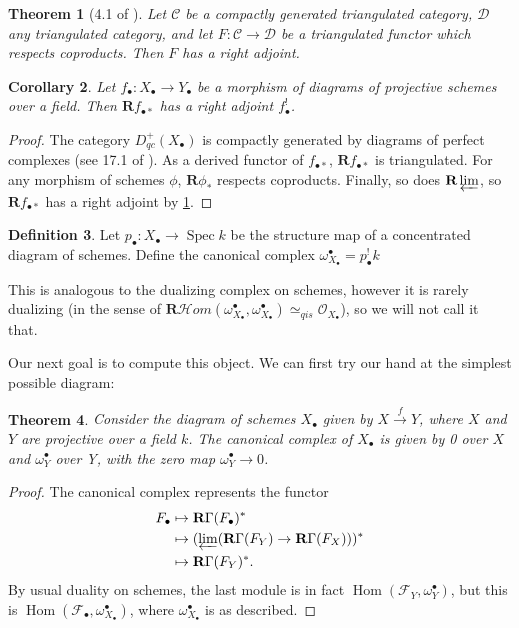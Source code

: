 \documentclass{report}
\newtheorem{theorem}{Theorem}[section]
\newtheorem{cor}[theorem]{Corollary}
\theoremstyle{definition}
\newtheorem{definition}[theorem]{Definition}
\DeclareMathOperator{\Hom}{Hom}
\newcommand{\cHom}{\mathcal{H} \textit{om}}
\DeclareMathOperator{\Spec}{Spec}
\newcommand{\CL}{\mathcal{C}}
\newcommand{\DD}{\mathcal{D}}
\newcommand{\FF}{\mathscr{F}}
\newcommand{\OO}{\mathcal{O}}
\newcommand{\qis}{\simeq_{qis}}
\newcommand{\bR}{\textbf{R}}
\begin{document}
\begin{theorem}[4.1 of \cite{Neeman1996}]
	\label{thm:neeman4.1}
	Let $\CL$ be a compactly generated triangulated category, $\DD$ any triangulated category, and let $F : \CL \rightarrow \DD$ be a triangulated functor which respects coproducts.
	Then $F$ has a right adjoint.
\end{theorem}

\begin{cor}
	Let $f_\bullet : X_\bullet \rightarrow Y_\bullet$ be a morphism of diagrams of projective schemes over a field.
	Then $\bR f_{\bullet *}$ has a right adjoint $f^!_\bullet$.
\end{cor}
\begin{proof}
	The category $D_{qc}^+(X_\bullet)$ is compactly generated by diagrams of perfect complexes (see 17.1 of \cite{Lipman2009}).
	As a derived functor of $f_{\bullet *}$, $\bR f_{\bullet *}$ is triangulated.
	For any morphism of schemes $\phi$, $\bR \phi_*$ respects coproducts.
	Finally, so does $\bR \varprojlim$, so $\bR f_{\bullet *}$ has a right adjoint by \ref{thm:neeman4.1}.
\end{proof}

\begin{definition}
	Let $p_\bullet : X_\bullet \rightarrow \Spec k$ be the structure map of a concentrated diagram of schemes.
	Define the canonical complex $\omega_{X_\bullet}^\bullet = p_\bullet^! k$
\end{definition}

This is analogous to the dualizing complex on schemes, however it is rarely dualizing (in the sense of $\bR \cHom(\omega_{X_\bullet}^\bullet, \omega_{X_\bullet}^\bullet) \qis \OO_{X_\bullet}$), so we will not call it that.

Our next goal is to compute this object.
We can first try our hand at the simplest possible diagram:
\begin{theorem}
	Consider the diagram of schemes $X_\bullet$ given by $X \xrightarrow{f} Y$, where $X$ and $Y$ are projective over a field $k$.
	The canonical complex of $X_\bullet$ is given by 0 over $X$ and $\omega^\bullet_Y$ over Y, with the zero map $\omega^\bullet_Y \rightarrow 0$.
\end{theorem}
\begin{proof}
	The canonical complex represents the functor
	\begin{align*}
	F_\bullet &\mapsto \bR \Gamma (F_\bullet)^* \\
	&\mapsto (\varprojlim (\bR \Gamma (F_Y) \rightarrow \bR \Gamma (F_X)))^* \\
	&\mapsto \bR \Gamma (F_Y)^*.
	\end{align*}
	By usual duality on schemes, the last module is in fact $\Hom(\FF_Y, \omega_Y^\bullet)$, but this is $\Hom(\FF_\bullet, \omega^\bullet_{X_\bullet})$, where $\omega^\bullet_{X_\bullet}$ is as described.
\end{proof}
\end{document}
